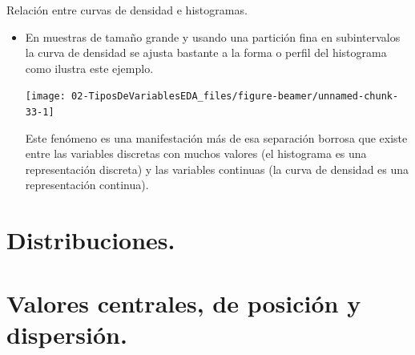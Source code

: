 \documentclass[
  9pt,
  ignorenonframetext,
]{beamer}
\newenvironment{Shaded}{\begin{snugshade}}{\end{snugshade}}
\newcommand{\DataTypeTok}[1]{\textcolor[rgb]{0.13,0.29,0.53}{#1}}
\newcommand{\DecValTok}[1]{\textcolor[rgb]{0.00,0.00,0.81}{#1}}
\newcommand{\KeywordTok}[1]{\textcolor[rgb]{0.13,0.29,0.53}{\textbf{#1}}}
\newcommand{\NormalTok}[1]{#1}
\newcommand{\OperatorTok}[1]{\textcolor[rgb]{0.81,0.36,0.00}{\textbf{#1}}}
\newcommand{\OtherTok}[1]{\textcolor[rgb]{0.56,0.35,0.01}{#1}}
\newcommand{\StringTok}[1]{\textcolor[rgb]{0.31,0.60,0.02}{#1}}
\begin{document}
\begin{frame}[fragile]{Relación entre curvas de densidad e histogramas.}
\protect\hypertarget{relacion-entre-curvas-de-densidad-e-histogramas.}{}

\begin{itemize}
\item
  En muestras de tamaño grande y usando una partición fina en
  subintervalos la curva de densidad se ajusta bastante a la forma o
  perfil del histograma como ilustra este ejemplo.

\begin{Shaded}
\end{Shaded}

  \begin{center}\texttt{[image: 02-TiposDeVariablesEDA\_files/figure-beamer/unnamed-chunk-33-1]} \end{center}

  Este fenómeno es una manifestación más de esa separación borrosa que
  existe entre las variables discretas con muchos valores (el histograma
  es una representación discreta) y las variables continuas (la curva de
  densidad es una representación continua).
\end{itemize}

\end{frame}

\hypertarget{distribuciones.}{%
\section{Distribuciones.}\label{distribuciones.}}

\hypertarget{valores-centrales-de-posicion-y-dispersion.}{%
\section{Valores centrales, de posición y
dispersión.}\label{valores-centrales-de-posicion-y-dispersion.}}
\end{document}
